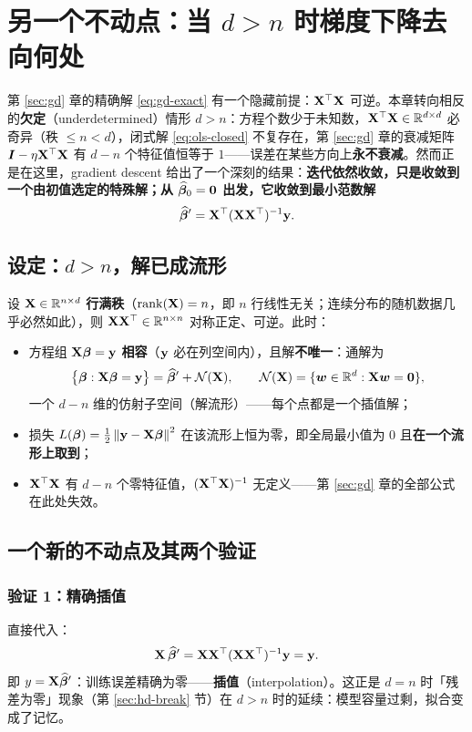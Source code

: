 \section{另一个不动点：当 $d > n$ 时梯度下降去向何处}\label{sec:gd-underdet}

第 \ref{sec:gd} 章的精确解 \eqref{eq:gd-exact} 有一个隐藏前提：$\mathbf{X}^\top\mathbf{X}$ 可逆。本章转向相反的\textbf{欠定}（underdetermined）情形 $d > n$：方程个数少于未知数，$\mathbf{X}^\top\mathbf{X} \in \mathbb{R}^{d \times d}$ 必奇异（秩 $\le n < d$），闭式解 \eqref{eq:ols-closed} 不复存在，第 \ref{sec:gd} 章的衰减矩阵 $\bm{I} - \eta\mathbf{X}^\top\mathbf{X}$ 有 $d - n$ 个特征值恒等于 $1$——误差在某些方向上\textbf{永不衰减}。然而正是在这里，gradient descent 给出了一个深刻的结果：\textbf{迭代依然收敛，只是收敛到一个由初值选定的特殊解；从 $\widehat{\bm{\beta}}_0 = \mathbf{0}$ 出发，它收敛到最小范数解}
\[
  \widehat{\bm{\beta}}' = \mathbf{X}^\top (\mathbf{X} \mathbf{X}^\top)^{-1} \mathbf{y} .
\]

\subsection{设定：$d > n$，解已成流形}\label{sec:underdet-setup}

设 $\mathbf{X} \in \mathbb{R}^{n \times d}$ \textbf{行满秩}（$\mathrm{rank}(\mathbf{X}) = n$，即 $n$ 行线性无关；连续分布的随机数据几乎必然如此），则 $\mathbf{X}\mathbf{X}^\top \in \mathbb{R}^{n \times n}$ 对称正定、可逆。此时：

\begin{itemize}
  \item 方程组 $\mathbf{X} \bm{\beta} = \mathbf{y}$ \textbf{相容}（$\mathbf{y}$ 必在列空间内），且解\textbf{不唯一}：通解为
  \[
    \big\{ \bm{\beta} : \mathbf{X} \bm{\beta} = \mathbf{y} \big\} = \widehat{\bm{\beta}}' + \mathcal{N}(\mathbf{X}),
    \qquad
    \mathcal{N}(\mathbf{X}) = \{ \bm{w} \in \mathbb{R}^d : \mathbf{X} \bm{w} = \mathbf{0} \},
  \]
  一个 $d - n$ 维的仿射子空间（解流形）——每个点都是一个插值解；
  \item 损失 $L(\bm{\beta}) = \frac{1}{2}\left\lVert \mathbf{y} - \mathbf{X}\bm{\beta} \right\rVert^2$ 在该流形上恒为零，即全局最小值为 $0$ 且\textbf{在一个流形上取到}；
  \item $\mathbf{X}^\top\mathbf{X}$ 有 $d - n$ 个零特征值，$(\mathbf{X}^\top\mathbf{X})^{-1}$ 无定义——第 \ref{sec:gd} 章的全部公式在此处失效。
\end{itemize}

\subsection{一个新的不动点及其两个验证}

\subsubsection*{验证 1：精确插值}
直接代入：
\begin{equation}\label{eq:interp}
  \mathbf{X} \, \widehat{\bm{\beta}}' = \mathbf{X} \mathbf{X}^\top (\mathbf{X} \mathbf{X}^\top)^{-1} \mathbf{y} = \mathbf{y} .
\end{equation}
即 $y = \mathbf{X} \widehat{\bm{\beta}}'$：训练误差精确为零——\textbf{插值}（interpolation）。这正是 $d = n$ 时「残差为零」现象（第 \ref{sec:hd-break} 节）在 $d > n$ 时的延续：模型容量过剩，拟合变成了记忆。

